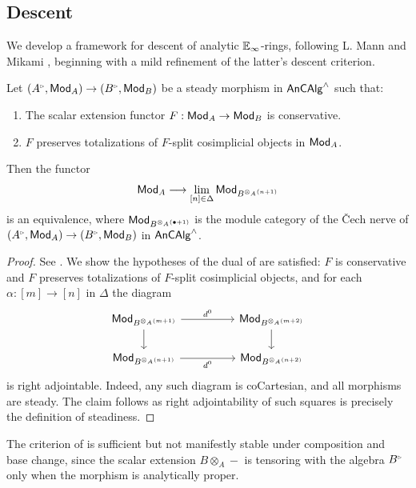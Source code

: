 \subsection{Descent}\label{subsec: descent}
We develop a framework for descent of analytic $\mathbb{E}_{\infty}$-rings, following L. Mann \cite[\S 2.5-2.8]{MannRigid6FF} and Mikami \cite[\S 2]{MikamiFFDescent}, beginning with a mild refinement of the latter's descent criterion.
\begin{proposition}\label{prop: Mikami descent}
    Let $(A^{\tri},\Mod_{A})\to (B^{\tri},\Mod_{B})$ be a steady morphism in $\mathsf{An}\mathsf{CAlg}^{\wedge}$ such that: 
    \begin{enumerate}[label=(\roman*)]
        \item The scalar extension functor $F:\mathsf{Mod}_{A}\to\mathsf{Mod}_{B}$ is conservative. 
        \item $F$ preserves totalizations of $F$-split cosimplicial objects in $\mathsf{Mod}_{A}$. 
    \end{enumerate}
    Then the functor 
    \begin{equation}\label{eqn: Cech nerve}
        \mathsf{Mod}_{A}\longrightarrow\lim_{[n]\in\Delta}\mathsf{Mod}_{B^{\otimes_{A}(n+1)}}
    \end{equation}
    is an equivalence, where $\mathsf{Mod}_{B^{\otimes_{A}(\bullet+1)}}$ is the module category of the \v{C}ech nerve of $(A^{\tri},\Mod_{A})\to (B^{\tri},\Mod_{B})$ in $\mathsf{An}\mathsf{CAlg}^{\wedge}$. 
\end{proposition}
\begin{proof}
    See \cite[Rmk. 2.18]{MikamiFFDescent}. We show the hypotheses of the dual of \cite[Cor. 4.7.5.3]{HA} are satisfied: $F$ is conservative and $F$ preserves totalizations of $F$-split cosimplicial objects, and for each $\alpha:[m]\to [n]$ in $\Delta$ the diagram 
    $$%
    \begin{tikzcd}
        {\Mod_{B^{\otimes_{A}(m+1)}}} && {\Mod_{B^{\otimes_{A}(m+2)}}} \\
        {\Mod_{B^{\otimes_{A}(n+1)}}} && {\Mod_{B^{\otimes_{A}(n+2)}}}
        \arrow["{d^{0}}", from=1-1, to=1-3]
        \arrow[from=1-1, to=2-1]
        \arrow[from=1-3, to=2-3]
        \arrow["{d^{0}}"', from=2-1, to=2-3]
    \end{tikzcd}$$
    is right adjointable. Indeed, any such diagram is coCartesian, and all morphisms are steady. The claim follows as right adjointability of such squares is precisely the definition of steadiness. 
\end{proof}
The criterion of  is sufficient but not manifestly stable under composition and base change, since the scalar extension $B\otimes_{A}-$ is tensoring with the algebra $B^{\tri}$ only when the morphism is analytically proper. 

